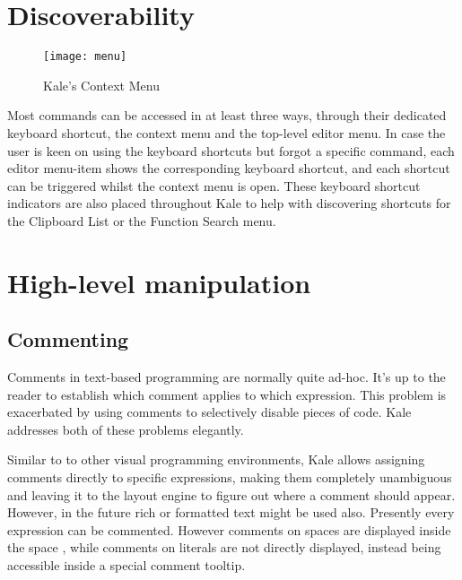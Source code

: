 





\needspace{8cm}
\section{Discoverability}
\begin{wrapfigure}[21]{r}{5.5cm}
\texttt{[image: menu]}
\caption{Kale's Context Menu}
\end{wrapfigure}
Most commands can be accessed in at least three ways, through their dedicated
keyboard shortcut, the context menu and the top-level editor menu. In case the
user is keen on using the keyboard shortcuts but forgot a specific command,
each editor menu-item shows the corresponding keyboard shortcut, and each
shortcut can be triggered whilst the context menu is open. These keyboard
shortcut indicators are also placed throughout Kale to help with discovering
shortcuts for the Clipboard List or the Function Search menu.




\section{High-level manipulation}

\subsection{Commenting}
Comments in text-based programming are normally quite ad-hoc. It's up to the
reader to establish which comment applies to which expression. This problem
is exacerbated by using comments to selectively disable pieces of code. Kale
addresses both of these problems elegantly.

Similar to to other visual
programming environments, Kale allows assigning comments directly to specific
expressions, making them completely unambiguous and leaving it to the layout
engine to figure out where a comment should appear. However, in the future rich or
formatted text might be used also. Presently every expression can be commented.
However comments on spaces are displayed inside the space , while
comments on literals are not directly displayed, instead being accessible
inside a special comment tooltip.

